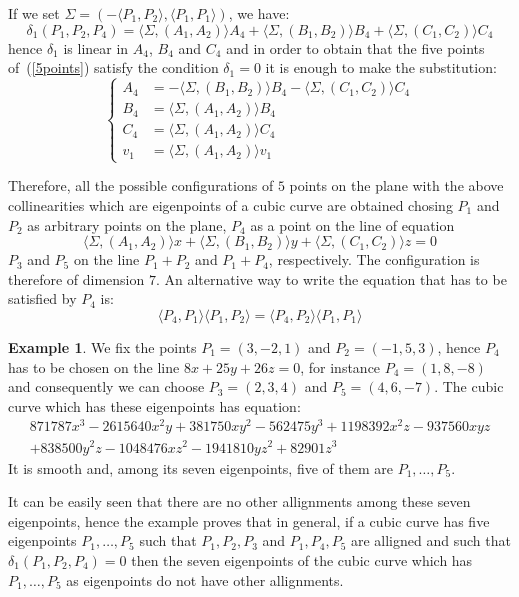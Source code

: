 \documentclass{amsart}
\theoremstyle{plain}
\theoremstyle{definition}
\newtheorem{example}[theorem]{Example}
\newcommand{\scl}[2]{\langle #1, #2 \rangle}
\begin{document}
If we set $\Sigma = \left(-\scl{P_1}{P_2}, \scl{P_1}{P_1}\right)$, we have:
\[
\delta_1(P_1, P_2, P_4) = \scl{\Sigma}{(A_1, A_2)}A_4+
\scl{\Sigma}{(B_1, B_2)}B_4+
\scl{\Sigma}{(C_1, C_2)}C_4
\]
hence $\delta_1$ 
is linear in $A_4$, $B_4$ and $C_4$ and in order to obtain that the five
points of~(\ref{5points}) satisfy the condition $\delta_1=0$ it is
enough to make the substitution:
\begin{equation}
\left\{
\begin{array}{cl}
  A_4 &= -\scl{\Sigma}{(B_1, B_2)}B_4-\scl{\Sigma}{(C_1, C_2)}C_4\\
  B_4 &= \scl{\Sigma}{(A_1, A_2)}B_4\\
  C_4 &= \scl{\Sigma}{(A_1, A_2)}C_4\\
  v_1 &= \scl{\Sigma}{(A_1, A_2)}v_1
\end{array}
\right.
\label{sst}
\end{equation}

Therefore, all the possible configurations of $5$ points on the plane
with the above collinearities which are eigenpoints of a cubic curve
are obtained chosing $P_1$ and $P_2$ as arbitrary points
on the plane, $P_4$ as a point on the line of equation
\[
\scl{\Sigma}{(A_1, A_2)}x+
\scl{\Sigma}{(B_1, B_2)}y+
\scl{\Sigma}{(C_1, C_2)}z = 0
\]
$P_3$ and $P_5$ on the line $P_1+P_2$ and $P_1+P_4$, respectively. The
configuration is therefore of dimension $7$. An alternative way to
write the equation that has to be satisfied by $P_4$ is:
\[
\scl{P_4}{P_1}\scl{P_1}{P_2} = \scl{P_4}{P_2}\scl{P_1}{P_1}
\]

\begin{example}
  \label{exmpl1}
  We fix the points $P_1 = (3, -2, 1)$ and $P_2 = (-1, 5, 3)$,
  hence $P_4$ has to be chosen on the line $8x + 25y + 26z=0$,
  for instance $P_4 = (1, 8, -8)$ and consequently we can choose
  $P_3 = (2, 3, 4)$ and $P_5 = (4, 6, -7)$.
  The cubic curve which has these eigenpoints has equation:
  \[
  \begin{array}{l}
    871787x^3 - 2615640x^2y + 381750xy^2 - 562475y^3 + 1198392x^2z
    - 937560xyz \\
    + 838500y^2z - 1048476xz^2 - 1941810yz^2 + 82901z^3
    \end{array}
  \]
  It is smooth and, among its seven eigenpoints, five of them are
  $P_1, \dots, P_5$.
\end{example}
It can be easily seen that there are no other allignments among these seven
eigenpoints, hence the example proves that in general, if a cubic curve
has five eigenpoints $P_1, \dots, P_5$ such that $P_1, P_2, P_3$ and
$P_1, P_4, P_5$ are alligned and such that $\delta_1(P_1, P_2, P_4) = 0$
then the seven eigenpoints of the cubic curve which has
$P_1, \dots, P_5$ as eigenpoints do not have other allignments.
\end{document}
